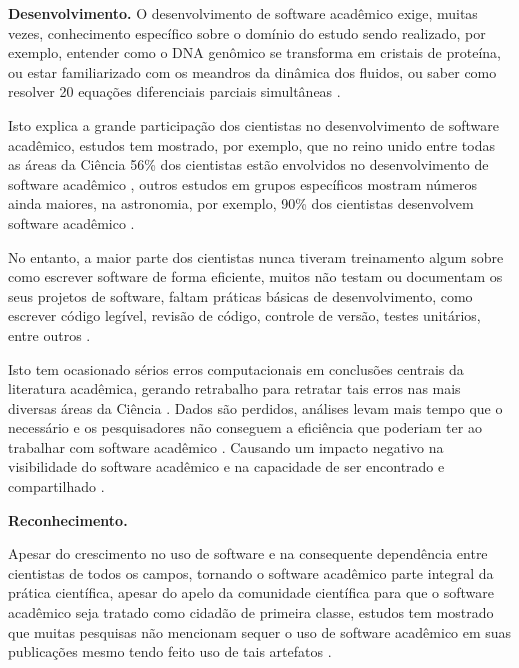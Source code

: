 \begin{description}
\item \textbf{Desenvolvimento.}
O desenvolvimento de software acadêmico exige, muitas vezes, conhecimento
específico sobre o domínio do estudo sendo realizado,
por exemplo, entender como o DNA genômico
se transforma em cristais de proteína, ou estar familiarizado com os meandros
da dinâmica dos fluidos, ou saber como resolver 20 equações diferenciais
parciais simultâneas \cite{segal2008developing}.

Isto explica a grande participação dos cientistas no desenvolvimento de
software acadêmico, estudos tem mostrado, por exemplo, que no reino unido entre todas as
áreas da Ciência 56\% dos cientistas estão envolvidos no desenvolvimento de
software acadêmico \cite{hettrick2014uk}, outros estudos em grupos específicos mostram números ainda
maiores, na astronomia, por exemplo, 90\% dos cientistas desenvolvem software
acadêmico \cite{momcheva2015software}.

No entanto, a maior parte dos cientistas nunca tiveram treinamento algum sobre como escrever
software de forma eficiente, muitos não testam ou documentam os seus projetos de
software, faltam práticas básicas de desenvolvimento, como escrever código
legível, revisão de código, controle de versão, testes unitários, entre outros
\cite{wilson2017good}.

Isto tem ocasionado sérios erros computacionais em conclusões centrais da
literatura acadêmica, gerando retrabalho para retratar tais erros nas mais
diversas áreas da Ciência \cite{merali2010computational}.
Dados são perdidos, análises levam mais tempo que o necessário e os
pesquisadores não conseguem a eficiência que poderiam ter ao trabalhar com
software acadêmico \cite{wilson2017good}.
Causando um impacto negativo na visibilidade do software acadêmico e na
capacidade de ser encontrado e compartilhado \cite{howison2013incentives,
katz2014transitive}.

\item \textbf{Reconhecimento.}

Apesar do crescimento no uso de software e na consequente dependência entre
cientistas de todos os campos, tornando o software acadêmico parte integral da
prática científica, apesar do apelo da comunidade científica para que o
software acadêmico seja tratado como cidadão de primeira classe, estudos tem
mostrado que muitas pesquisas não mencionam sequer o uso de software acadêmico
em suas publicações mesmo tendo feito uso de tais artefatos
\cite{momcheva2015software, howison2016software}.


\end{description}

